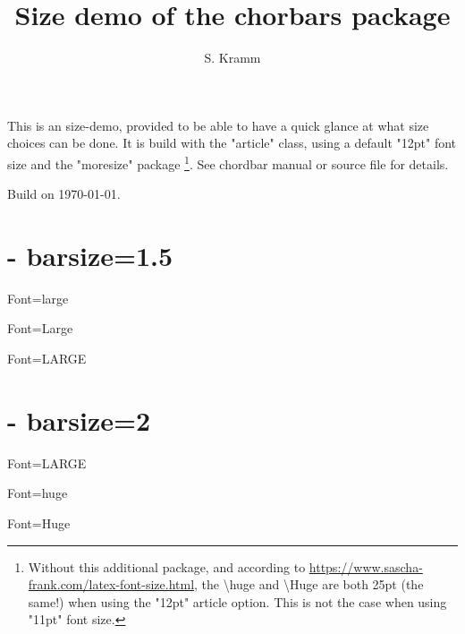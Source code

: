 \documentclass[12pt]{article}
\title{Size demo of the chorbars package}
\author{S. Kramm}
\begin{document}
\countbarsNo

\songtitle


This is an size-demo, provided to be able to have a quick glance at what size choices can be done.
It is build with the "article" class,
using a default "12pt" font size and the "moresize" package
\footnote{Without this additional package, and according to \url{https://www.sascha-frank.com/latex-font-size.html},
the \textbackslash huge and \textbackslash Huge are both 25pt (the same!) when using the "12pt" article option.
This is not the case when using "11pt" font size.}.
See chordbar manual or source file for details.

Build on \today.

\section{- barsize=1.5}
\def\barsize{1.5}%

\def\chordFontSize{\large\bfseries}
\begin{chordbar}{4}{Font=large}
\end{chordbar}


\def\chordFontSize{\Large\bfseries}
\begin{chordbar}{4}{Font=Large}
\end{chordbar}

\def\chordFontSize{\LARGE\bfseries}
\begin{chordbar}{4}{Font=LARGE}
\end{chordbar}

\section{- barsize=2}
\def\barsize{2}%

\def\chordFontSize{\LARGE\bfseries}
\begin{chordbar}{4}{Font=LARGE}
\end{chordbar}

\def\chordFontSize{\huge\bfseries}
\begin{chordbar}{4}{Font=huge}
\end{chordbar}


\def\chordFontSize{\Huge\bfseries}
\begin{chordbar}{4}{Font=Huge}
\end{chordbar}
\end{document}
